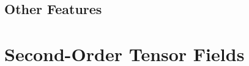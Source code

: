 %
\subsection{Other Features} %
\label{sub:other_features}
%

%
%
%
%
%
%

\section{Second-Order Tensor Fields} %
\label{sec:tensor_fields}


